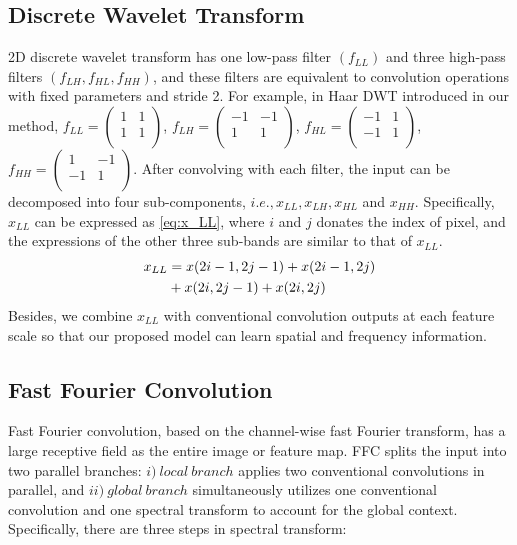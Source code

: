 \documentclass[10pt,twocolumn,letterpaper]{article}
\begin{document}
\subsection{Discrete Wavelet Transform}
\label{sec:DWT}
2D discrete wavelet transform has one low-pass filter $(f_{LL} )$ and three high-pass filters $(f_{LH}, f_{HL}, f_{HH} )$, and these filters are equivalent to convolution operations with fixed parameters and stride 2. For example, in Haar DWT introduced in our method, $f_{LL}=\left (\begin{matrix}1 & 1 \\ 1 & 1 \\ \end{matrix}\right)$, $f_{LH}=\left (\begin{matrix}-1 & -1 \\ 1 & 1 \\ \end{matrix}\right)$, $f_{HL}=\left (\begin{matrix}-1 & 1 \\ -1 & 1 \\ \end{matrix}\right)$, $f_{HH}=\left (\begin{matrix}1 & -1 \\ -1 & 1 \\ \end{matrix}\right)$. After convolving with each filter, the input can be decomposed into four sub-components, $i.e., x_{LL}, x_{LH}, x_{HL}$ and $x_{HH}$. Specifically, $x_{LL}$ can be expressed as \cref{eq:x_LL}, where $i$ and $j$ donates the index of pixel, and the expressions of the other three sub-bands are similar to that of $x_{LL}$.
\begin{equation}
\setlength\abovedisplayskip{2pt}%
\setlength\belowdisplayskip{2pt}
\begin{split}
  x_{LL} &= x(2i-1,2j-1)+x(2i-1,2j)\\
  &+x(2i,2j-1)+x(2i,2j)
  \label{eq:x_LL}
\end{split}
\end{equation}
Besides, we combine $x_{LL}$ with conventional convolution outputs at each feature scale so that our proposed model can learn spatial and frequency information.
\subsection{Fast Fourier Convolution}
\label{sec:FFC}
Fast Fourier convolution, based on the channel-wise fast Fourier transform, has a large receptive field as the entire image or feature map. FFC splits the input into two parallel branches: $i)\ local\ branch$ applies two conventional convolutions in parallel, and $ii)\ global\ branch$ simultaneously utilizes one conventional convolution and one spectral transform to account for the global context. Specifically, there are three steps in spectral transform:
\end{document}
